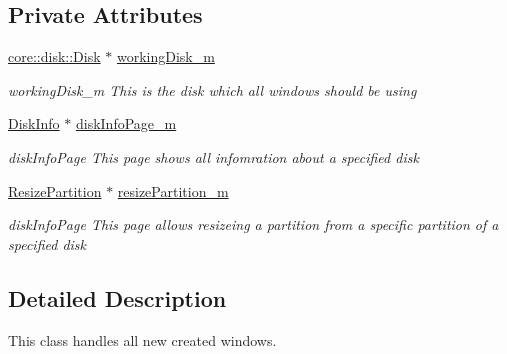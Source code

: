 \subsection*{Private Attributes}
\begin{DoxyCompactItemize}
\item 
\mbox{\label{classui_1_1window_1_1_detail_page_a6e23be528d79660b733da5130b237671}} 
\mbox{\hyperlink{classcore_1_1disk_1_1_disk}{core\+::disk\+::\+Disk}} $\ast$ \mbox{\hyperlink{classui_1_1window_1_1_detail_page_a6e23be528d79660b733da5130b237671}{working\+Disk\+\_\+m}}
\begin{DoxyCompactList}\small\item\em working\+Disk\+\_\+m This is the disk which all windows should be using \end{DoxyCompactList}\item 
\mbox{\label{classui_1_1window_1_1_detail_page_a8d92bb2023fcec9ea1e5f89b51ca6f5e}} 
\mbox{\hyperlink{classui_1_1window_1_1_disk_info}{Disk\+Info}} $\ast$ \mbox{\hyperlink{classui_1_1window_1_1_detail_page_a8d92bb2023fcec9ea1e5f89b51ca6f5e}{disk\+Info\+Page\+\_\+m}}
\begin{DoxyCompactList}\small\item\em disk\+Info\+Page This page shows all infomration about a specified disk \end{DoxyCompactList}\item 
\mbox{\label{classui_1_1window_1_1_detail_page_a03d29770a526ca650e3ed145d800ab1d}} 
\mbox{\hyperlink{classui_1_1window_1_1_resize_partition}{Resize\+Partition}} $\ast$ \mbox{\hyperlink{classui_1_1window_1_1_detail_page_a03d29770a526ca650e3ed145d800ab1d}{resize\+Partition\+\_\+m}}
\begin{DoxyCompactList}\small\item\em disk\+Info\+Page This page allows resizeing a partition from a specific partition of a specified disk \end{DoxyCompactList}\end{DoxyCompactItemize}


\subsection{Detailed Description}
This class handles all new created windows. 

